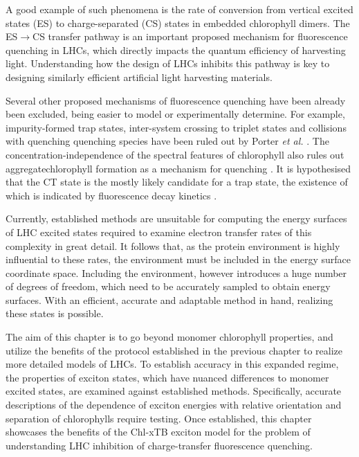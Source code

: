 A good example of such phenomena is the rate of conversion from vertical excited
states (ES) to charge-separated (CS) states in embedded chlorophyll dimers. The ES$\rightarrow$CS
transfer pathway is an important proposed mechanism for fluorescence quenching in
LHCs, which directly impacts the quantum efficiency of harvesting light. Understanding 
how the design of LHCs inhibits this pathway is key to designing similarly efficient
artificial light harvesting materials.

Several other proposed mechanisms of fluorescence quenching have been already been 
excluded, being easier to model or experimentally determine. For example, impurity-formed
trap states, inter-system crossing to triplet states and collisions with quenching
quenching species have been ruled out by Porter \emph{et al.} \cite{Kelly1970}. 
The concentration-independence of the spectral features of chlorophyll also rules 
out aggregatechlorophyll formation as a mechanism for quenching \cite{Kelly1970, Kelly1971, Beddard1976a}. 
It is hypothesised that the CT state is the mostly likely candidate for a trap state,
\cite{Gutschick1978, Seely1978, Kelly1971} the existence of which is indicated by 
fluorescence decay kinetics  \cite{Yuen1980}.

Currently, established methods are unsuitable for computing the energy surfaces of 
LHC excited states required to examine electron transfer rates of this complexity 
in great detail. It follows that, as the protein environment is highly influential
to these rates, the environment must be included in the energy surface coordinate
space. Including the environment, however introduces a huge number of degrees of 
freedom, which need to be accurately sampled to obtain energy surfaces. With an
efficient, accurate and adaptable method in hand, realizing these states is possible.

The aim of this chapter is to go beyond monomer chlorophyll properties, and 
utilize the benefits of the protocol established in the previous chapter to realize
more detailed models of LHCs. To establish accuracy in this expanded regime, the 
properties of exciton states, which have nuanced differences to monomer excited 
states, are examined against established methods. Specifically, accurate descriptions
of the dependence of exciton energies with relative orientation and separation of 
chlorophylls require testing. Once established, this chapter showcases the benefits
of the Chl-xTB exciton model for the problem of understanding LHC inhibition of 
charge-transfer fluorescence quenching.

